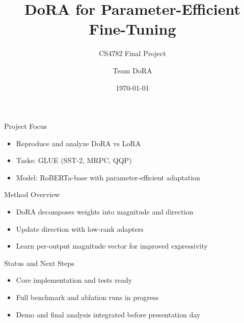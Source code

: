 \documentclass[aspectratio=169]{beamer}
\title{DoRA for Parameter-Efficient Fine-Tuning}
\subtitle{CS4782 Final Project}
\author{Team DoRA}
\date{\today}
\begin{document}
\frame{\titlepage}

\begin{frame}{Project Focus}
\begin{itemize}
  \item Reproduce and analyze DoRA vs LoRA
  \item Tasks: GLUE (SST-2, MRPC, QQP)
  \item Model: RoBERTa-base with parameter-efficient adaptation
\end{itemize}
\end{frame}

\begin{frame}{Method Overview}
\begin{itemize}
  \item DoRA decomposes weights into magnitude and direction
  \item Update direction with low-rank adapters
  \item Learn per-output magnitude vector for improved expressivity
\end{itemize}
\end{frame}

\begin{frame}{Status and Next Steps}
\begin{itemize}
  \item Core implementation and tests ready
  \item Full benchmark and ablation runs in progress
  \item Demo and final analysis integrated before presentation day
\end{itemize}
\end{frame}
\end{document}
